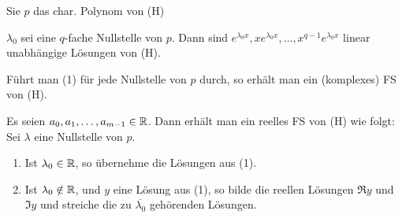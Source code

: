 \documentclass{article}
\begin{document}
\begin{satz} %
Sie $p$ das char. Polynom von (H) \\
\begin{liste}
\item $\lambda_0$ sei eine $q$-fache Nullstelle von $p$. Dann sind $e^{\lambda_0x}, xe^{\lambda_0x}, \ldots, x^{q-1}e^{\lambda_0x}$ linear unabhängige Lösungen von (H).
\item Führt man (1) für jede Nullstelle von $p$ durch, so erhält man ein (komplexes) FS von (H).
\item Es seien $a_0, a_1, \ldots, a_{m-1} \in \mathbb{R}$. Dann erhält man ein reelles FS von (H) wie folgt: \\
Sei $\lambda$ eine Nullstelle von $p$.
\begin{enumerate}
\item Ist $\lambda_0 \in \mathbb{R}$, so übernehme die Lösungen aus (1).
\item Ist $\lambda_0 \notin \mathbb{R}$, und $y$ eine Lösung aus (1), so bilde die reellen Lösungen $\Re y$ und $\Im y$ und streiche die zu $\overline{\lambda_0}$ gehörenden Lösungen.
\end{enumerate}
\end{liste}
\end{satz}
\end{document}
